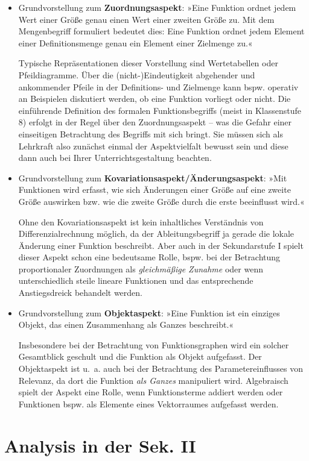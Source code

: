 \documentclass[
]{scrbook}
\theoremstyle{definition}
\theoremstyle{definition}
\theoremstyle{definition}
\theoremstyle{definition}
\theoremstyle{remark}
\begin{document}
\begin{itemize}
\item
  Grundvorstellung zum \textbf{Zuordnungsaspekt}: »Eine Funktion ordnet jedem Wert einer Größe genau einen Wert einer zweiten Größe zu. Mit dem Mengenbegriff formuliert bedeutet dies: Eine Funktion ordnet jedem Element einer Definitionsmenge genau ein Element einer Zielmenge zu.«

  Typische Repräsentationen dieser Vorstellung sind Wertetabellen oder Pfeildiagramme. Über die (nicht-)Eindeutigkeit abgehender und ankommender Pfeile in der Definitions- und Zielmenge kann bspw. operativ an Beispielen diskutiert werden, ob eine Funktion vorliegt oder nicht. Die einführende Definition des formalen Funktionsbegriffs (meist in Klassenstufe 8) erfolgt in der Regel über den Zuordnungsaspekt -- was die Gefahr einer einseitigen Betrachtung des Begriffs mit sich bringt. Sie müssen sich als Lehrkraft also zunächst einmal der Aspektvielfalt bewusst sein und diese dann auch bei Ihrer Unterrichtsgestaltung beachten.
\item
  Grundvorstellung zum \textbf{Kovariationsaspekt/Änderungsaspekt}: »Mit Funktionen wird erfasst, wie sich Änderungen einer Größe auf eine zweite Größe auswirken bzw. wie die zweite Größe durch die erste beeinflusst wird.«

  Ohne den Kovariationsaspekt ist kein inhaltliches Verständnis von Differenzialrechnung möglich, da der Ableitungsbegriff ja gerade die lokale Änderung einer Funktion beschreibt. Aber auch in der Sekundarstufe I spielt dieser Aspekt schon eine bedeutsame Rolle, bspw. bei der Betrachtung proportionaler Zuordnungen als \emph{gleichmäßige Zunahme} oder wenn unterschiedlich steile lineare Funktionen und das entsprechende Anstiegsdreick behandelt werden.
\item
  Grundvorstellung zum \textbf{Objektaspekt}: »Eine Funktion ist ein einziges Objekt, das einen Zusammenhang als Ganzes beschreibt.«

  Insbesondere bei der Betrachtung von Funktionsgraphen wird ein solcher Gesamtblick geschult und die Funktion als Objekt aufgefasst. Der Objektaspekt ist u.~a. auch bei der Betrachtung des Parametereinflusses von Relevanz, da dort die Funktion \emph{als Ganzes} manipuliert wird. Algebraisch spielt der Aspekt eine Rolle, wenn Funktionsterme addiert werden oder Funktionen bspw. als Elemente eines Vektorraumes aufgefasst werden.
\end{itemize}

\hypertarget{analysis-in-der-sek.-ii}{%
\section{Analysis in der Sek. II}\label{analysis-in-der-sek.-ii}}
\end{document}
